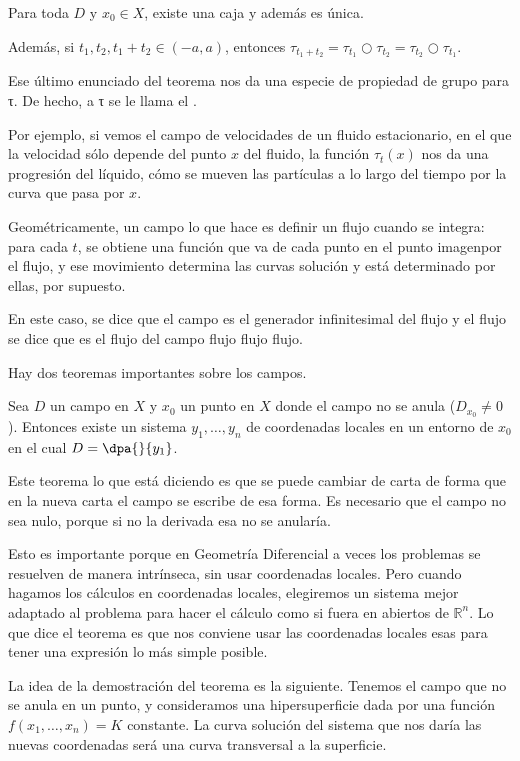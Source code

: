 \begin{theorem} Para toda $D$ y $x_0 ∈ X$, existe una caja y además es única.

Además, si $t_1, t_2, t_1 + t_2 ∈ (-a, a)$, entonces $τ_{t_1+t_2} = τ_{t_1} ○ τ_{t_2} = τ_{t_2} ○ τ_{t_1}$.
\end{theorem}

Ese último enunciado del teorema nos da una especie de propiedad de grupo para τ. De hecho, a τ se le llama el .

Por ejemplo, si vemos el campo de velocidades de un fluido estacionario, en el que la velocidad sólo depende del punto $x$ del fluido, la función $τ_t(x)$ nos da una progresión del líquido, cómo se mueven las partículas a lo largo del tiempo por la curva que pasa por $x$.

Geométricamente, un campo lo que hace es definir un flujo cuando se integra: para cada $t$, se obtiene una función que va de cada punto en el punto imagenpor el flujo, y ese movimiento determina las curvas solución y está determinado por ellas, por supuesto.

En este caso, se dice que el campo es el generador infinitesimal del flujo y el flujo se dice que es el flujo del campo flujo flujo flujo.

Hay dos teoremas importantes sobre los campos.

\begin{theorem} Sea $D$ un campo en $X$ y $x_0$ un punto en $X$ donde el campo no se anula ($D_{x_0} ≠ 0$). Entonces existe un sistema $y_1, \dotsc, y_n$ de coordenadas locales en un entorno de $x_0$ en el cual $D = \dpa{}{y_1}$. \label{thmEnderezamientoCampos}
\end{theorem}

Este teorema lo que está diciendo es que se puede cambiar de carta de forma que en la nueva carta el campo se escribe de esa forma. Es necesario que el campo no sea nulo, porque si no la derivada esa no se anularía.

Esto es importante porque en Geometría Diferencial a veces los problemas se resuelven de manera intrínseca, sin usar coordenadas locales. Pero cuando hagamos los cálculos en coordenadas locales, elegiremos un sistema mejor adaptado al problema para hacer el cálculo como si fuera en abiertos de $ℝ^n$. Lo que dice el teorema es que nos conviene usar las coordenadas locales esas para tener una expresión lo más simple posible.

La idea de la demostración del teorema es la siguiente. Tenemos el campo que no se anula en un punto, y consideramos una hipersuperficie dada por una función $f(x_1, \dotsc, x_n) = K$ constante. La curva solución del sistema que nos daría las nuevas coordenadas será una curva transversal a la superficie.

